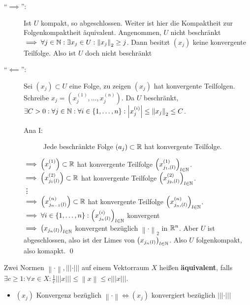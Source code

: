 \begin{subproof*}
	\begin{description}
		\item[``$ \implies  $'':] Ist $ U $ kompakt, so abgeschlossen. Weiter ist hier die Kompaktheit zur Folgenkompaktheit äquivalent.
			Angenommen, $ U $ nicht beschränkt $ \implies \forall j \in \mathbb{N} : \exists x_j \in U : \left\| x_j \right\| _2 \geq j $.
			Dann besitzt $ (x_j) $ keine konvergente Teilfolge.
			Also ist $ U $ doch nicht beschränkt
		\item[``$ \impliedby  $'':] Sei $ (x_j) \subset U $ eine Folge, zu zeigen $ (x_j) $ hat konvergente Teilfolgen.
			Schreibe $ x_j = \left( x_j^{(1)} , \dotsc, x_j^{(n)}  \right)  $.
			Da $ U $ beschränkt, $ \exists C > 0 : \forall j \in \mathbb{N} : \forall i \in \left\{ 1, \dotsc, n \right\} : \left| x_j^{(i)}  \right| \leq \left\| x_j \right\| _2 \leq C $.

			\begin{description}
				\item[Ana I:] Jede beschränkte Folge $ (a_j) \subset \mathbb{R}  $ hat konvergente Teilfolge.
			\end{description}
					$ \implies \left( x_j^{(1)}  \right) \subset \mathbb{R}  $ hat konvergente Teilfolge $ \left( x_{j_1, (l)} ^{(1)}  \right) _{l \in \mathbb{N} }  $.\\
					$ \implies \left( x_{j_1(l)} ^{(2)}  \right) \subset \mathbb{R}  $ hat konvergente Teilfolge $ \left( x_{j_2, (l)} ^{(2)}  \right) _{l \in \mathbb{N} }  $.\\
					\vdots\\
					$ \implies \left( x_{j_{n-1}(l) } ^{(n)}  \right) \subset \mathbb{R}  $ hat konvergente Teilfolge $ \left( x_{j_n, (l)} ^{(n)}  \right) _{l \in \mathbb{N} }  $.\\
					$ \implies \forall i \in \left\{ 1, \dotsc, n \right\} : \left( x_{j_n(l)} ^{(i)}  \right) _{l \in \mathbb{N} }  $ konvergent\\
					$ \implies \left( x_{j_n(l)} \right) _{l \in \mathbb{N} }  $ konvergent bezüglich $ \left\| \cdot  \right\| _{2}  $ in $ \mathbb{R} ^n $.
					Aber $  U $ ist abgeschlossen, also ist der Limes von $ \left( x_{j_n(l)}  \right) _{l \in \mathbb{N} }  $.
					Also $ U $ folgenkompakt, also komapkt. \qed
	\end{description}
\end{subproof*}

\begin{subdefinition}
	Zwei Normen $ \left\| \cdot  \right\| , | | | \cdot | | | $ auf einem Vektorraum $ X $ heißen \textbf{äquivalent}, falls $ \exists c \geq 1 : \forall x \in X : \frac{ 1 }{ c } | | | x | | | \leq \left\| x \right\| \leq c | | | x | | | $.
	\begin{itemize}
		\item $ (x_j) $ Konvergenz bezüglich $ \left\| \cdot  \right\| \iff (x_j) $ konvergiert bezüglich $ | | | \cdot | | | $
	\end{itemize}
\end{subdefinition}

